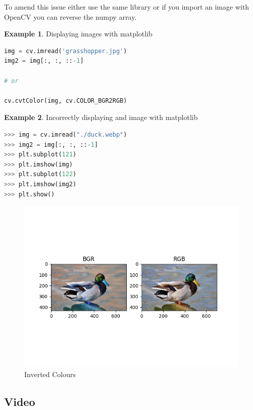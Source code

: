 \documentclass{article}
\theoremstyle{definition}
\newtheorem{ex}{Example}[subsection]
\theoremstyle{remark}
\begin{document}
To amend this issue either use the same library or if you import an image with OpenCV you can reverse the numpy array.\\

\begin{ex} Displaying images with matplotlib
\begin{lstlisting}[language=Python]
img = cv.imread('grasshopper.jpg')
img2 = img[:, :, ::-1]

# or

cv.cvtColor(img, cv.COLOR_BGR2RGB)
\end{lstlisting}
\end{ex}

\hfill

\begin{ex} Incorrectly displaying and image with matplotlib
\begin{lstlisting}[language=Python]
>>> img = cv.imread("./duck.webp")
>>> img2 = img[:, :, ::-1]
>>> plt.subplot(121)
>>> plt.imshow(img)
>>> plt.subplot(122)
>>> plt.imshow(img2)
>>> plt.show()
\end{lstlisting}
\begin{figure}[h!]
    \centering
    \includegraphics[width=\textwidth]{opencv_inv_cols}
    \caption{Inverted Colours}
    \label{fig:ocv_inv_cols}
\end{figure}


\end{ex}


\break


\subsection{Video}
\end{document}
